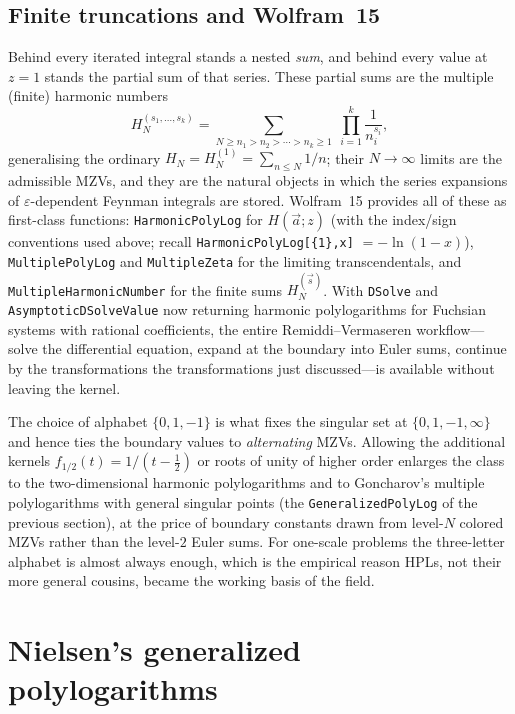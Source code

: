 \subsection{Finite truncations and Wolfram~15}

Behind every iterated integral stands a nested \emph{sum}, and behind every value at $z=1$ stands the partial sum of that series. These partial sums are the multiple (finite) harmonic numbers
\[
  H^{(s_1,\dots,s_k)}_{N}=\sum_{N\ge n_1>n_2>\cdots>n_k\ge1}\;\prod_{i=1}^{k}\frac{1}{n_i^{s_i}},
\]
generalising the ordinary $H_N=H_N^{(1)}=\sum_{n\le N}1/n$; their $N\to\infty$ limits are the admissible MZVs, and they are the natural objects in which the series expansions of $\varepsilon$-dependent Feynman integrals are stored. Wolfram~15 provides all of these as first-class functions: \texttt{HarmonicPolyLog} for $H(\vec a;z)$ (with the index/sign conventions used above; recall \texttt{HarmonicPolyLog[\{1\},x]} $=-\ln(1-x)$), \texttt{MultiplePolyLog} and \texttt{MultipleZeta} for the limiting transcendentals, and \texttt{MultipleHarmonicNumber} for the finite sums $H^{(\vec s)}_N$. With \texttt{DSolve} and \texttt{AsymptoticDSolveValue} now returning harmonic polylogarithms for Fuchsian systems with rational coefficients, the entire Remiddi--Vermaseren workflow---solve the differential equation, expand at the boundary into Euler sums, continue by the transformations the transformations just discussed---is available without leaving the kernel.

\begin{remark}
The choice of alphabet $\{0,1,-1\}$ is what fixes the singular set at $\{0,1,-1,\infty\}$ and hence ties the boundary values to \emph{alternating} MZVs. Allowing the additional kernels $f_{1/2}(t)=1/(t-\tfrac12)$ or roots of unity of higher order enlarges the class to the two-dimensional harmonic polylogarithms and to Goncharov's multiple polylogarithms with general singular points (the \texttt{GeneralizedPolyLog} of the previous section), at the price of boundary constants drawn from level-$N$ colored MZVs rather than the level-$2$ Euler sums. For one-scale problems the three-letter alphabet is almost always enough, which is the empirical reason HPLs, not their more general cousins, became the working basis of the field.
\end{remark}


\section{Nielsen's generalized polylogarithms}

